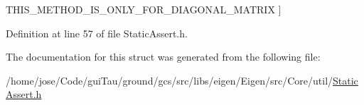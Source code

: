 \begin{Desc}
\begin{description}
{\hypertarget{structei__static__assert_3_01true_01_4_ada5f400d6b61aa0566ded13d516502e1ac836c3c442201ad1d3b1eb18317c01e9}{T\-H\-I\-S\-\_\-\-M\-E\-T\-H\-O\-D\-\_\-\-I\-S\-\_\-\-O\-N\-L\-Y\-\_\-\-F\-O\-R\-\_\-\-D\-I\-A\-G\-O\-N\-A\-L\-\_\-\-M\-A\-T\-R\-I\-X}\label{structei__static__assert_3_01true_01_4_ada5f400d6b61aa0566ded13d516502e1ac836c3c442201ad1d3b1eb18317c01e9}
}]\end{description}
\end{Desc}


Definition at line 57 of file Static\-Assert.\-h.



The documentation for this struct was generated from the following file\-:\begin{DoxyCompactItemize}
\item 
/home/jose/\-Code/gui\-Tau/ground/gcs/src/libs/eigen/\-Eigen/src/\-Core/util/\hyperlink{_static_assert_8h}{Static\-Assert.\-h}\end{DoxyCompactItemize}
